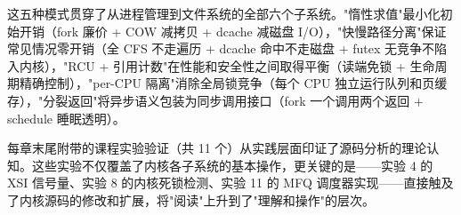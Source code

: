 \documentclass[a4paper]{article}
\begin{document}
这五种模式贯穿了从进程管理到文件系统的全部六个子系统。"惰性求值"最小化初始开销（fork 廉价 + COW 减拷贝 + dcache 减磁盘 I/O），"快慢路径分离"保证常见情况零开销（全 CFS 不走遍历 + dcache 命中不走磁盘 + futex 无竞争不陷入内核），"RCU + 引用计数"在性能和安全性之间取得平衡（读端免锁 + 生命周期精确控制），"per-CPU 隔离"消除全局锁竞争（每个 CPU 独立运行队列和页缓存），"分裂返回"将异步语义包装为同步调用接口（fork 一个调用两个返回 + schedule 睡眠透明）。

每章末尾附带的课程实验验证（共 11 个）从实践层面印证了源码分析的理论认知。这些实验不仅覆盖了内核各子系统的基本操作，更关键的是——实验 4 的 XSI 信号量、实验 8 的内核死锁检测、实验 11 的 MFQ 调度器实现——直接触及了内核源码的修改和扩展，将"阅读"上升到了"理解和操作"的层次。

\end{document}
